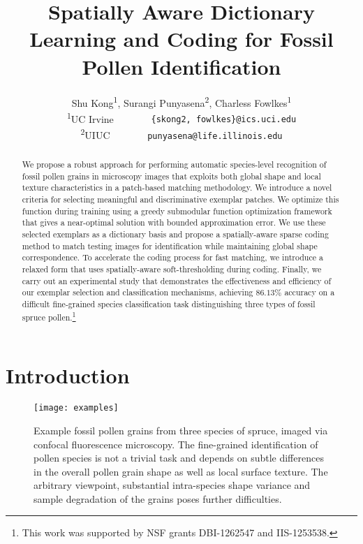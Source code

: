 \documentclass[10pt,twocolumn,letterpaper]{article}
\begin{document}
\title{Spatially Aware Dictionary Learning and Coding for  Fossil Pollen Identification}


\author{Shu Kong\textsuperscript{1}, Surangi Punyasena\textsuperscript{2}, Charless Fowlkes\textsuperscript{1}\\
\textsuperscript{1}UC Irvine  \ \ \ \ \ \ \
{\tt\small \{skong2, fowlkes\}@ics.uci.edu}\\
\textsuperscript{2}UIUC  \ \ \ \ \ \ \
{\tt\small punyasena@life.illinois.edu}
}








\maketitle
\begin{abstract}
We propose a robust approach for performing automatic species-level recognition
of fossil pollen grains in microscopy images that exploits both global shape
and local texture characteristics in a patch-based matching methodology. We
introduce a novel criteria for selecting meaningful and discriminative exemplar
patches.  We optimize this function during training using a greedy submodular
function optimization framework that gives a near-optimal solution with bounded
approximation error.  We use these selected exemplars as a dictionary
basis and propose a spatially-aware sparse coding method to match testing
images for identification while maintaining global shape correspondence.
To accelerate the coding process for fast matching, we introduce a relaxed form
that uses spatially-aware soft-thresholding during coding.
Finally, we carry out an experimental study that
demonstrates the effectiveness and efficiency of our exemplar selection and
classification mechanisms, achieving $86.13\%$ accuracy on a difficult
fine-grained species classification task distinguishing three types of
fossil spruce pollen.\footnote{This work was supported by NSF grants DBI-1262547 and IIS-1253538.}

\end{abstract}


\section{Introduction}

\begin{figure*}[t]
\centering
   \texttt{[image: examples]}
\vspace{-1mm}
   \caption{Example fossil pollen grains from three species of spruce, imaged
   via confocal fluorescence microscopy.  The fine-grained identification of
   pollen species is not a trivial task and depends on subtle differences in
   the overall pollen grain shape as well as local surface texture.  The
   arbitrary viewpoint, substantial intra-species shape variance and sample
   degradation of the grains poses further difficulties.
   }
\label{fig:examples}
\vspace{-4mm}
\end{figure*}
\end{document}
